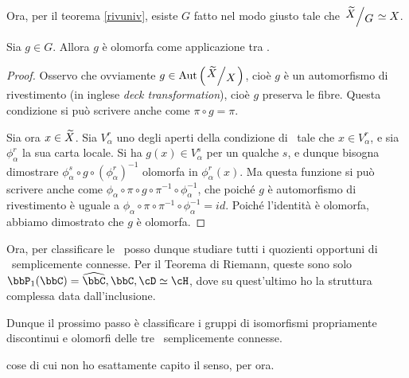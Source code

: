Ora, per il teorema \ref{rivuniv}, esiste $G$ fatto nel modo giusto tale che $\quoziente{\ot X}{G}\isom X$.
\begin{lemma}
 	Sia $g\in G$. Allora $g$ è olomorfa come applicazione tra \sdR.
\end{lemma}
\begin{proof}
 	Osservo che ovviamente $g \in \mbox{Aut}\left(\quoziente{\ot X}{X}\right)$, cioè $g$ è un automorfismo di rivestimento (in inglese \emph{deck transformation}), cioè $g$ preserva le fibre. Questa condizione si può scrivere anche come $\pi\circ g=\pi$.
 	
 	Sia ora $x\in \widetilde{X}$. Sia $V_\alpha^r$ uno degli aperti della condizione di \sdR\ tale che $x\in V_\alpha^r$, e sia $\phi_\alpha^r$ la sua carta locale. Si ha $g(x)\in V_\alpha^s$ per un qualche $s$, e dunque bisogna dimostrare $\phi_\alpha^s\circ g\circ (\phi_\alpha^r)^{-1}$ olomorfa in $\phi_\alpha^r(x)$. Ma questa funzione si può scrivere anche come $\phi_\alpha\circ\pi\circ g\circ \pi^{-1}\circ \phi_\alpha^{-1}$, che poiché $g$ è automorfismo di rivestimento è uguale a $\phi_\alpha\circ\pi\circ\pi^{-1}\circ\phi_\alpha^{-1}=id$. Poiché l'identità è olomorfa, abbiamo dimostrato che $g$ è olomorfa.
\end{proof}

Ora, per classificare le \sdR\ posso dunque studiare tutti i quozienti opportuni di \sdR\ semplicemente connesse. Per il Teorema di Riemann, queste sono solo $\bbP_1(\bbC)=\oc \bbC, \bbC, \cD\isom\cH$, dove su quest'ultimo ho la struttura complessa data dall'inclusione.

Dunque il prossimo passo è classificare i gruppi di isomorfismi propriamente discontinui e olomorfi delle tre \sdR\ semplicemente connesse.

 cose di cui non ho esattamente capito il senso, per ora.







